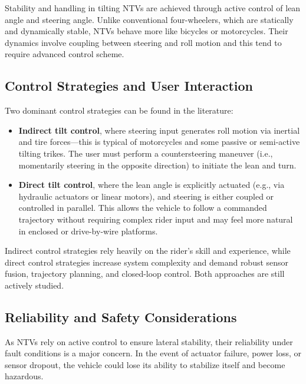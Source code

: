 Stability and handling in tilting NTVs are achieved through active control of lean angle and steering angle. Unlike conventional four-wheelers, which are statically and dynamically stable, NTVs behave more like bicycles or motorcycles. Their dynamics involve coupling between steering and roll motion and this tend to require advanced control scheme.

\newpage 

\subsection*{Control Strategies and User Interaction}

Two dominant control strategies can be found in the literature:

\begin{itemize}
    \item \textbf{Indirect tilt control}, where steering input generates roll motion via inertial and tire forces—this is typical of motorcycles and some passive or semi-active tilting trikes. The user must perform a countersteering maneuver (i.e., momentarily steering in the opposite direction) to initiate the lean and turn.
    
    \item \textbf{Direct tilt control}, where the lean angle is explicitly actuated (e.g., via hydraulic actuators or linear motors), and steering is either coupled or controlled in parallel. This allows the vehicle to follow a commanded trajectory without requiring complex rider input and may feel more natural in enclosed or drive-by-wire platforms.
\end{itemize}

Indirect control strategies rely heavily on the rider's skill and experience, while direct control strategies increase system complexity and demand robust sensor fusion, trajectory planning, and closed-loop control. Both approaches are still actively studied.

\subsection*{Reliability and Safety Considerations}

As NTVs rely on active control to ensure lateral stability, their reliability under fault conditions is a major concern. In the event of actuator failure, power loss, or sensor dropout, the vehicle could lose its ability to stabilize itself and become hazardous. 

